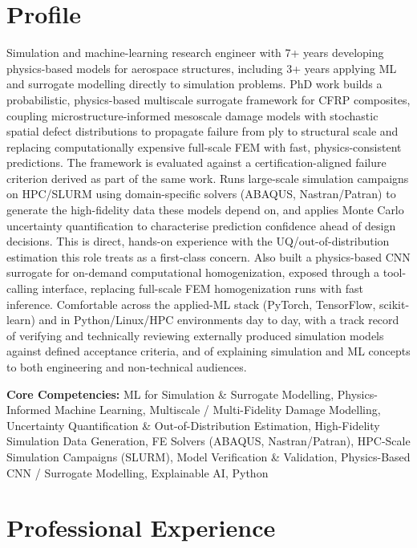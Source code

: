 \documentclass[a4paper,20pt]{article}
\begin{document}
\section{\color{blue}Profile}
Simulation and machine-learning research engineer with 7+ years developing physics-based models for aerospace structures, including 3+ years applying ML and surrogate modelling directly to simulation problems. PhD work builds a probabilistic, physics-based multiscale surrogate framework for CFRP composites, coupling microstructure-informed mesoscale damage models with stochastic spatial defect distributions to propagate failure from ply to structural scale and replacing computationally expensive full-scale FEM with fast, physics-consistent predictions. The framework is evaluated against a certification-aligned failure criterion derived as part of the same work. Runs large-scale simulation campaigns on HPC/SLURM using domain-specific solvers (ABAQUS, Nastran/Patran) to generate the high-fidelity data these models depend on, and applies Monte Carlo uncertainty quantification to characterise prediction confidence ahead of design decisions. This is direct, hands-on experience with the UQ/out-of-distribution estimation this role treats as a first-class concern. Also built a physics-based CNN surrogate for on-demand computational homogenization, exposed through a tool-calling interface, replacing full-scale FEM homogenization runs with fast inference. Comfortable across the applied-ML stack (PyTorch, TensorFlow, scikit-learn) and in Python/Linux/HPC environments day to day, with a track record of verifying and technically reviewing externally produced simulation models against defined acceptance criteria, and of explaining simulation and ML concepts to both engineering and non-technical audiences.

\vspace{0.2cm}
\textbf{Core Competencies:} ML for Simulation \& Surrogate Modelling, Physics-Informed Machine Learning, Multiscale / Multi-Fidelity Damage Modelling, Uncertainty Quantification \& Out-of-Distribution Estimation, High-Fidelity Simulation Data Generation, FE Solvers (ABAQUS, Nastran/Patran), HPC-Scale Simulation Campaigns (SLURM), Model Verification \& Validation, Physics-Based CNN / Surrogate Modelling, Explainable AI, Python

\section{\color{blue}Professional Experience}
\end{document}
